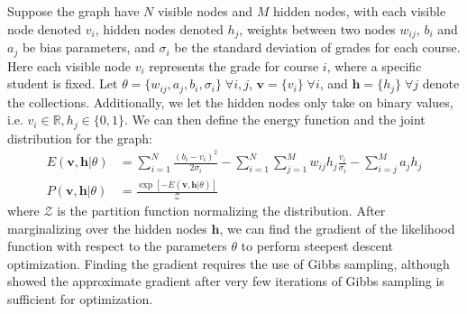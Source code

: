 \documentclass[12pt]{article}
\newcommand{\de}{\partial}
\begin{document}
Suppose the graph have $N$ visible nodes and $M$ hidden nodes,
with each visible node denoted $v_i$, hidden nodes denoted $h_j$, 
weights between two nodes $w_{ij}$,
$b_i$ and $a_j$ be bias parameters,
and $\sigma_i$ be the standard deviation of grades for each course.
Here each visible node $v_i$ represents the grade for course $i$,
where a specific student is fixed.
Let $\theta = \{ w_{ij},a_j,b_i,\sigma_i \} \; \forall i,j$,
$\mathbf{v} = \{v_i\} \; \forall i$,
and $\mathbf{h} = \{h_j\} \; \forall j$ denote the collections.
Additionally, we let the hidden nodes only take on binary values, 
i.e. $v_i \in \mathbb{R}, h_j \in \{0,1\}$.
We can then define the energy function and 
the joint distribution for the graph:
%
\begin{equation}
\begin{aligned}
    E(\mathbf{v},\mathbf{h}|\theta) &= 
        \displaystyle\sum_{i=1}^N \frac{(b_i - v_i)^2}{2 \sigma_i}
        - \displaystyle\sum_{i=1}^N \displaystyle\sum_{j=1}^M
             w_{ij} h_j \frac{v_i}{\sigma_i}
        - \displaystyle\sum_{i=j}^M a_j h_j \\
%
%
    P(\mathbf{v},\mathbf{h}|\theta) &= 
        \frac{\exp\left[-E(\mathbf{v},\mathbf{h}|\theta)\right]}
        {\mathcal{Z}}
\end{aligned}
\end{equation}
%
where $\mathcal{Z}$ is the partition function normalizing
the distribution.
After marginalizing over the hidden nodes $\mathbf{h}$, 
we can find the gradient of the likelihood function
with respect to the parameters $\theta$
to perform steepest descent optimization.
Finding the gradient requires the use of Gibbs sampling,
although \cite{SaMnHi07} showed the approximate gradient
after very few iterations of Gibbs sampling is sufficient 
for optimization.
%
%
\end{document}
